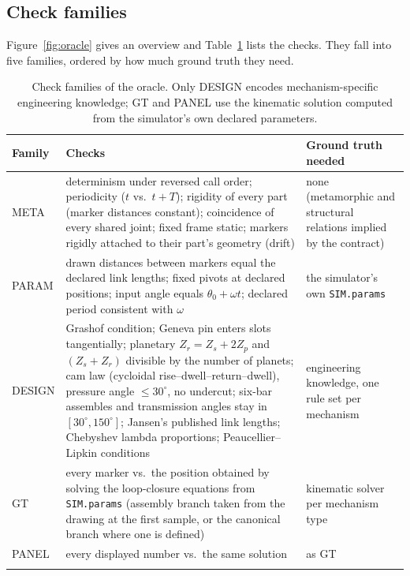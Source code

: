 \subsection{Check families}
Figure~\ref{fig:oracle} gives an overview and Table~\ref{tab:checks} lists the checks. They fall into five families, ordered by how much ground truth they need.



\begin{table}[t]
\caption{Check families of the oracle. Only DESIGN encodes mechanism-specific engineering knowledge; GT and PANEL use the kinematic solution computed from the simulator's own declared parameters.}\label{tab:checks}
\begin{tabular*}{\textwidth}{@{\extracolsep\fill}lp{}p{}}
\toprule
Family & Checks & Ground truth needed \\
\midrule
META & determinism under reversed call order; periodicity ($t$ vs.\ $t+T$); rigidity of every part (marker distances constant); coincidence of every shared joint; fixed frame static; markers rigidly attached to their part's geometry (drift) & none (metamorphic and structural relations implied by the contract) \\
PARAM & drawn distances between markers equal the declared link lengths; fixed pivots at declared positions; input angle equals $\theta_0+\omega t$; declared period consistent with $\omega$ & the simulator's own \texttt{SIM.params} \\
DESIGN & Grashof condition; Geneva pin enters slots tangentially; planetary $Z_r=Z_s+2Z_p$ and $(Z_s+Z_r)$ divisible by the number of planets; cam law (cycloidal rise--dwell--return--dwell), pressure angle $\le 30^\circ$, no undercut; six-bar assembles and transmission angles stay in $[30^\circ,150^\circ]$; Jansen's published link lengths; Chebyshev lambda proportions; Peaucellier--Lipkin conditions & engineering knowledge, one rule set per mechanism \\
GT & every marker vs.\ the position obtained by solving the loop-closure equations from \texttt{SIM.params} (assembly branch taken from the drawing at the first sample, or the canonical branch where one is defined) & kinematic solver per mechanism type \\
PANEL & every displayed number vs.\ the same solution & as GT \\
\botrule
\end{tabular*}
\end{table}

